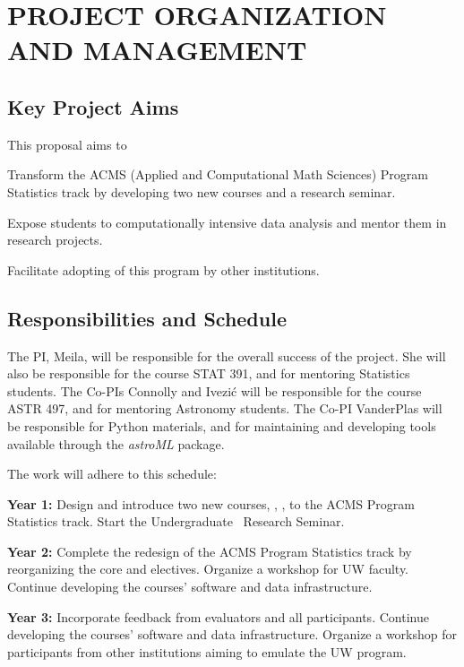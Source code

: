 
\section{    {\bf        PROJECT ORGANIZATION AND MANAGEMENT         }}
\label{plan}

\subsection{                      Key Project Aims                   }
 
This proposal aims to 
\bits
\item Transform the ACMS (Applied and Computational Math Sciences) Program Statistics track
by developing two new courses and a research seminar. 
\item Expose students to computationally intensive data analysis and mentor them in research projects. 
\item Facilitate adopting of this program by other institutions.
\eits  

\subsection{Responsibilities and Schedule}

The PI, Meila, will be responsible for the overall success of the project. She will also be 
responsible for the course STAT 391, and for mentoring Statistics students. The Co-PIs 
Connolly and Ivezi\'{c} will be responsible for the course ASTR 497, and for mentoring 
Astronomy students. The Co-PI VanderPlas will be responsible for Python materials, 
and for maintaining and developing tools available through the {\it astroML} package. 

The work will adhere to this schedule: 
\bits
\item {\bf  Year 1:} Design and introduce two new courses, \statcl, \astrocl, to
the ACMS Program Statistics track. Start the Undergraduate \cdse\ Research Seminar. 
\item {\bf Year 2:} Complete the redesign of the ACMS Program Statistics track
by reorganizing the core and electives. Organize a workshop for UW faculty. 
Continue developing the courses' software and data infrastructure. 
\item {\bf Year 3:} Incorporate feedback from evaluators and all participants. 
Continue developing the courses' software and data infrastructure. 
Organize a workshop for participants from other institutions aiming to 
emulate the UW program.
\eits

